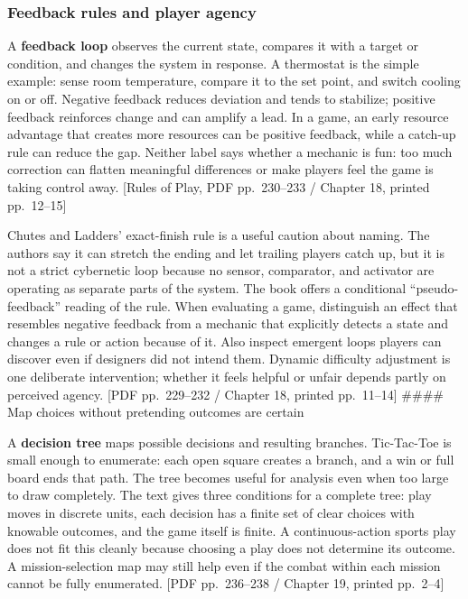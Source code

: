 \subsubsection{Feedback rules and player agency}\label{05-engine-i-ch009-feedback-rules-and-player-agency}

\hypertarget{05-engine-i-ch009-feedback-rules-and-player-agency}{}

A \textbf{feedback loop} observes the current state, compares it with a target or condition, and changes the system in response. A thermostat is the simple example: sense room temperature, compare it to the set point, and switch cooling on or off. Negative feedback reduces deviation and tends to stabilize; positive feedback reinforces change and can amplify a lead. In a game, an early resource advantage that creates more resources can be positive feedback, while a catch-up rule can reduce the gap. Neither label says whether a mechanic is fun: too much correction can flatten meaningful differences or make players feel the game is taking control away. {[}Rules of Play, PDF pp.~230--233 / Chapter 18, printed pp.~12--15{]}

Chutes and Ladders' exact-finish rule is a useful caution about naming. The authors say it can stretch the ending and let trailing players catch up, but it is not a strict cybernetic loop because no sensor, comparator, and activator are operating as separate parts of the system. The book offers a conditional ``pseudo-feedback'' reading of the rule. When evaluating a game, distinguish an effect that resembles negative feedback from a mechanic that explicitly detects a state and changes a rule or action because of it. Also inspect emergent loops players can discover even if designers did not intend them. Dynamic difficulty adjustment is one deliberate intervention; whether it feels helpful or unfair depends partly on perceived agency. {[}PDF pp.~229--232 / Chapter 18, printed pp.~11--14{]} \#\#\#\# Map choices without pretending outcomes are certain

A \textbf{decision tree} maps possible decisions and resulting branches. Tic-Tac-Toe is small enough to enumerate: each open square creates a branch, and a win or full board ends that path. The tree becomes useful for analysis even when too large to draw completely. The text gives three conditions for a complete tree: play moves in discrete units, each decision has a finite set of clear choices with knowable outcomes, and the game itself is finite. A continuous-action sports play does not fit this cleanly because choosing a play does not determine its outcome. A mission-selection map may still help even if the combat within each mission cannot be fully enumerated. {[}PDF pp.~236--238 / Chapter 19, printed pp.~2--4{]}

